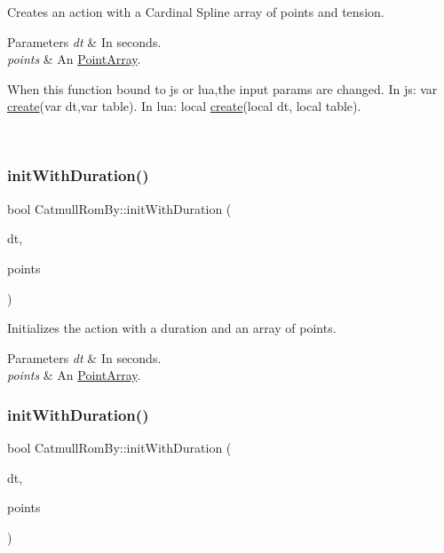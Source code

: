 Creates an action with a Cardinal Spline array of points and tension. 
\begin{DoxyParams}{Parameters}
{\em dt} & In seconds. \\
\hline
{\em points} & An \hyperlink{classPointArray}{Point\+Array}. 
\begin{DoxyCode}
When \textcolor{keyword}{this} \textcolor{keyword}{function} bound to js or lua,the input params are changed.
In js: var \hyperlink{classCatmullRomBy_a160dd33d583d05632b51e21e95ccfd9b}{create}(var dt,var table).
In lua: local \hyperlink{classCatmullRomBy_a160dd33d583d05632b51e21e95ccfd9b}{create}(local dt, local table).
\end{DoxyCode}
 \\
\hline
\end{DoxyParams}
\mbox{\label{classCatmullRomBy_a4bb8a1b728fbe433583cabe1f62c436d}} 
\subsubsection{\texorpdfstring{init\+With\+Duration()}{initWithDuration()}\hspace{0.1cm}{\footnotesize\ttfamily [1/2]}}
{\footnotesize\ttfamily bool Catmull\+Rom\+By\+::init\+With\+Duration (\begin{DoxyParamCaption}\item[{float}]{dt,  }\item[{\hyperlink{classPointArray}{Point\+Array} $\ast$}]{points }\end{DoxyParamCaption})}

Initializes the action with a duration and an array of points.


\begin{DoxyParams}{Parameters}
{\em dt} & In seconds. \\
\hline
{\em points} & An \hyperlink{classPointArray}{Point\+Array}. \\
\hline
\end{DoxyParams}
\mbox{\label{classCatmullRomBy_a4bb8a1b728fbe433583cabe1f62c436d}} 
\subsubsection{\texorpdfstring{init\+With\+Duration()}{initWithDuration()}\hspace{0.1cm}{\footnotesize\ttfamily [2/2]}}
{\footnotesize\ttfamily bool Catmull\+Rom\+By\+::init\+With\+Duration (\begin{DoxyParamCaption}\item[{float}]{dt,  }\item[{\hyperlink{classPointArray}{Point\+Array} $\ast$}]{points }\end{DoxyParamCaption})}

